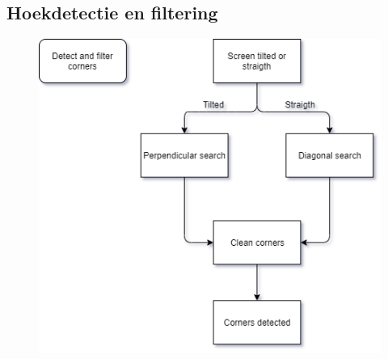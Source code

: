 \documentclass[a4paper,11pt]{article}
\begin{document}
\subsection{Hoekdetectie en filtering}
\begin{figure}[H]
	\centering
	\includegraphics[scale= 1]{img/DetectAndFilterCorners.png}
	\caption{}
	\label{bijlageA2}
\end{figure}
\newpage
\end{document}
